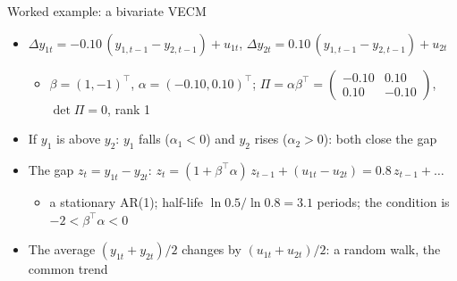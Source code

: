 \begin{frame}{Worked example: a bivariate VECM}
\itemsize{\small}
\begin{itemize}
    \item $\Delta y_{1t} = -0.10\,(y_{1,t-1} - y_{2,t-1}) + u_{1t}$, \quad $\Delta y_{2t} = 0.10\,(y_{1,t-1} - y_{2,t-1}) + u_{2t}$
    \begin{itemize}
        \item $\beta = (1, -1)^\top$, $\alpha = (-0.10, 0.10)^\top$; $\Pi = \alpha\beta^\top = \begin{pmatrix} -0.10 & 0.10 \\ 0.10 & -0.10 \end{pmatrix}$, $\det\Pi = 0$, rank 1
    \end{itemize}
    \item If $y_1$ is above $y_2$: $y_1$ falls ($\alpha_1 < 0$) and $y_2$ rises ($\alpha_2 > 0$): both close the gap
    \item The gap $z_t = y_{1t} - y_{2t}$: $z_t = (1 + \beta^\top\alpha)\,z_{t-1} + (u_{1t} - u_{2t}) = 0.8\,z_{t-1} + \dots$
    \begin{itemize}
        \item a stationary AR(1); half-life $\ln 0.5/\ln 0.8 = 3.1$ periods; the condition is $-2 < \beta^\top\alpha < 0$
    \end{itemize}
    \item The average $(y_{1t} + y_{2t})/2$ changes by $(u_{1t} + u_{2t})/2$: a random walk, the common trend
\end{itemize}
\end{frame}

